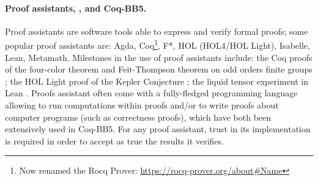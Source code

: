 \documentclass[a4paper,british]{article}
\theoremstyle{definition} %
\numberwithin{equation}{section}
\theoremstyle{definition} %
\newcommand{\ts}[1]{{\color{red}#1}}
\newcommand{\CoqBB}{Coq-BB5\xspace}
\begin{document}

\paragraph{Proof assistants, \Coq, and \CoqBB.} Proof assistants are software tools able to express and verify formal proofs; some popular proof assistants are: Agda, Coq\footnote{Now renamed the Rocq Prover: \url{https://rocq-prover.org/about\#Name}}, F*, HOL (HOL4/HOL Light), Isabelle, Lean, Metamath. Milestones in the use of proof assistants include: the Coq proofs of the four-color theorem \cite{gonthier2008formal, gonthier2023computer} and Feit-Thompson theorem on odd orders finite groups \cite{gonthier2013machine}; the HOL Light proof of the Kepler Conjecture \cite{3fdf2c9143a54629bba02e34f24c7698}; the liquid tensor experiment in Lean \cite{2309.14870}. Proofs assistant often come with a fully-fledged programming language allowing to run computations within proofs and/or to write proofs about computer programs (such as correctness proofs), which have both been extensively used in \CoqBB. For any proof assistant, trust in its implementation is required in order to accept as true the results it verifies.
\end{document}
